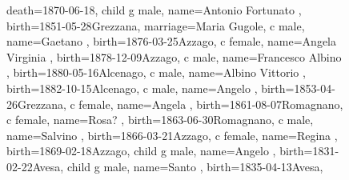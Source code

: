 \documentclass{article}
\begin{document}
\begin{figure}
\begin{genealogypicture}
{{{{{                        death={1870-06-18}{},
                    }
                    child{
                        g{
                            male,
                            name={Antonio Fortunato },
                            birth={1851-05-28}{Grezzana},
                            marriage={Maria Gugole}{},
                        }
                        c{
                            male,
                            name={Gaetano },
                            birth={1876-03-25}{Azzago},
                        }
                        c{
                            female,
                            name={Angela Virginia },
                            birth={1878-12-09}{Azzago},
                        }
                        c{
                            male,
                            name={Francesco Albino },
                            birth={1880-05-16}{Alcenago},
                        }
                        c{
                            male,
                            name={Albino Vittorio },
                            birth={1882-10-15}{Alcenago},
                        }
                    }
                    c{
                        male,
                        name={Angelo },
                        birth={1853-04-26}{Grezzana},
                    }
                    c{
                        female,
                        name={Angela },
                        birth={1861-08-07}{Romagnano},
                    }
                    c{
                        female,
                        name={Rosa? },
                        birth={1863-06-30}{Romagnano},
                    }
                    c{
                        male,
                        name={Salvino },
                        birth={1866-03-21}{Azzago},
                    }
                    c{
                        female,
                        name={Regina },
                        birth={1869-02-18}{Azzago},
                    }
                }
                child{
                    g{
                        male,
                        name={Angelo },
                        birth={1831-02-22}{Avesa},
                    }
                }
                child{
                    g{
                        male,
                        name={Santo },
                        birth={1835-04-13}{Avesa},
                    }
                }
            }
        }
    }
    \end{genealogypicture}

\label{fig:figure5}
\end{figure}
\end{document}
